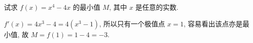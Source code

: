 \begin{prob}
\label{prob:prob-10}
试求 $f(x) = x^4 - 4x$ 的最小值 $M$, 其中 $x$ 是任意的实数.
\end{prob}

\begin{soln}
$f'(x) = 4x^3 - 4 = 4(x^3 - 1)$, 所以只有一个极值点 $x=1$,
容易看出该点亦是最小值, 故 $M = f(1) = 1 - 4 = \boxed{-3.}$
\end{soln}
